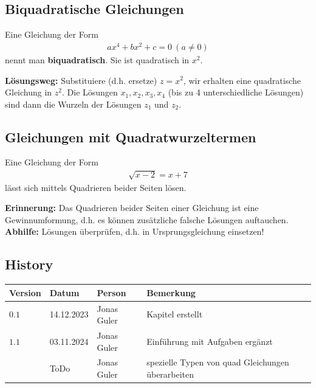 \documentclass[11pt,oneside]{article}
\begin{document}
\subsection{Biquadratische Gleichungen}
	Eine Gleichung der Form
	\begin{align*}
		ax^4+bx^2+c=0~ (a\neq 0)
	\end{align*}
	nennt man \textbf{biquadratisch}. Sie ist quadratisch in $x^2$.
	\begin{framed}\noindent
		\textbf{Lösungsweg:}
		Substituiere (d.h. ersetze) $z=x^2$, wir erhalten eine quadratische Gleichung in $z^2$. Die Lösungen $x_1,x_2,x_3,x_4$ (bis zu 4 unterschiedliche Lösungen) sind dann die Wurzeln der Lösungen $z_1$ und $z_2$.
	\end{framed}
\subsection{Gleichungen mit Quadratwurzeltermen}
	Eine Gleichung der Form
	\begin{align*}
		\sqrt{x-2}=x+7
	\end{align*}
	lässt sich mittels Quadrieren beider Seiten lösen.
	\begin{framed}\noindent
		\textbf{Erinnerung:} Das Quadrieren beider Seiten einer Gleichung ist eine Gewinnumformung, d.h. es können zusätzliche falsche Lösungen auftauchen.\\
		\textbf{Abhilfe:}
		Lösungen überprüfen, d.h. in Ursprungsgleichung einsetzen!
	\end{framed}


\newpage
\subsection*{History}
\begin{table}[H]
	\centering
	\begin{tabular}{|p{13mm}|p{20mm}|p{30mm}|p{70mm}|}\hline
		Version & Datum & Person & Bemerkung \\\hline
		$0.1$ & 14.12.2023 & Jonas Guler & Kapitel erstellt \\\hline
		$1.1$ & 03.11.2024 & Jonas Guler & Einführung mit Aufgaben ergänzt \\\hline
		& ToDo & Jonas Guler & spezielle Typen von quad Gleichungen überarbeiten \\\hline
	\end{tabular}
\end{table}
\end{document}
